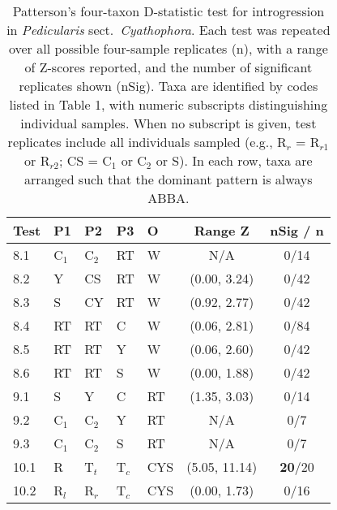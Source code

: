 \documentclass[12pt,letterpaper]{article}
\begin{document}
\begin{table}
\caption{Patterson's four-taxon D-statistic test for introgression in \emph{Pedicularis} sect.\ \emph{Cyathophora}. Each test was repeated over all possible four-sample replicates (n), with a range of Z-scores reported, and the number of significant replicates shown (nSig). Taxa are identified by codes listed in Table 1, with numeric subscripts distinguishing individual samples. When no subscript is given, test replicates include all individuals sampled (e.g., R$_r$ = R$_{r1}$ or R$_{r2}$; CS = C$_1$ or C$_2$ or S). In each row, taxa are arranged such that the dominant pattern is always ABBA.}

\label{tab:4}
\begin{center}
\begin{tabular*}{0.75\textwidth}{@{\extracolsep{\fill}}lllllcc}
\hline
Test         & P1   & P2       & P3          & O           &Range Z      & nSig / n \\
\hline
\hline
8.1          & C$_1$  & C$_2$  & RT         & W            &N/A             & 0/14 \\
8.2          & Y    & CS      & RT         & W            &(0.00, 3.24)    & 0/42 \\
8.3          & S    & CY      & RT         & W            &(0.92, 2.77)    & 0/42 \\
8.4          & RT  & RT      & C           & W            &(0.06, 2.81)    & 0/84 \\
8.5          & RT  & RT      & Y           & W            &(0.06, 2.60)    & 0/42 \\
8.6          & RT  & RT      & S           & W            &(0.00, 1.88)    & 0/42 \\
9.1          & S    & Y        & C         & RT           &(1.35, 3.03)    & 0/14 \\
9.2          & C$_1$& C$_2$    & Y         & RT           &N/A              & 0/7    \\
9.3          & C$_1$& C$_2$    & S         & RT           &N/A              & 0/7      \\
10.1         & R    & T$_t$    & T$_c$     & CYS          &(5.05, 11.14)   & {\bf20}/20 \\
10.2          & R$_{l}$ & R$_{r}$ & T$_c$      & CYS        &(0.00, 1.73)    & 0/16     \\

\end{tabular*}
\end{center}
\end{table}
\end{document}
